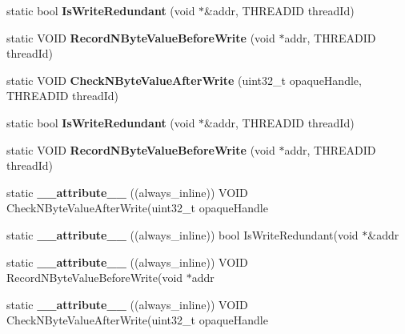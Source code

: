 \begin{DoxyCompactItemize}
\item 
\hypertarget{structRedSpyAnalysis_a0a5d87c8a4ffd7e99a66272071b48b2a}{static bool {\bfseries Is\-Write\-Redundant} (void $\ast$\&addr, T\-H\-R\-E\-A\-D\-I\-D thread\-Id)}\label{structRedSpyAnalysis_a0a5d87c8a4ffd7e99a66272071b48b2a}

\item 
\hypertarget{structRedSpyAnalysis_a267b5e1224f000fe96f66a25317811dd}{static V\-O\-I\-D {\bfseries Record\-N\-Byte\-Value\-Before\-Write} (void $\ast$addr, T\-H\-R\-E\-A\-D\-I\-D thread\-Id)}\label{structRedSpyAnalysis_a267b5e1224f000fe96f66a25317811dd}

\item 
\hypertarget{structRedSpyAnalysis_a25213888f435527a83af11e93c7d0bf5}{static V\-O\-I\-D {\bfseries Check\-N\-Byte\-Value\-After\-Write} (uint32\-\_\-t opaque\-Handle, T\-H\-R\-E\-A\-D\-I\-D thread\-Id)}\label{structRedSpyAnalysis_a25213888f435527a83af11e93c7d0bf5}

\item 
\hypertarget{structRedSpyAnalysis_a0a5d87c8a4ffd7e99a66272071b48b2a}{static bool {\bfseries Is\-Write\-Redundant} (void $\ast$\&addr, T\-H\-R\-E\-A\-D\-I\-D thread\-Id)}\label{structRedSpyAnalysis_a0a5d87c8a4ffd7e99a66272071b48b2a}

\item 
\hypertarget{structRedSpyAnalysis_a267b5e1224f000fe96f66a25317811dd}{static V\-O\-I\-D {\bfseries Record\-N\-Byte\-Value\-Before\-Write} (void $\ast$addr, T\-H\-R\-E\-A\-D\-I\-D thread\-Id)}\label{structRedSpyAnalysis_a267b5e1224f000fe96f66a25317811dd}

\item 
\hypertarget{structRedSpyAnalysis_ab62f13b23858cc46ae34b668b71afe80}{static {\bfseries \-\_\-\-\_\-attribute\-\_\-\-\_\-} ((always\-\_\-inline)) V\-O\-I\-D Check\-N\-Byte\-Value\-After\-Write(uint32\-\_\-t opaque\-Handle}\label{structRedSpyAnalysis_ab62f13b23858cc46ae34b668b71afe80}

\item 
\hypertarget{structRedSpyAnalysis_a7535fac0a0e053e60b39fa2f23b3701f}{static {\bfseries \-\_\-\-\_\-attribute\-\_\-\-\_\-} ((always\-\_\-inline)) bool Is\-Write\-Redundant(void $\ast$\&addr}\label{structRedSpyAnalysis_a7535fac0a0e053e60b39fa2f23b3701f}

\item 
\hypertarget{structRedSpyAnalysis_ad09b31fd6c23d44ab50798a11711fb1a}{static {\bfseries \-\_\-\-\_\-attribute\-\_\-\-\_\-} ((always\-\_\-inline)) V\-O\-I\-D Record\-N\-Byte\-Value\-Before\-Write(void $\ast$addr}\label{structRedSpyAnalysis_ad09b31fd6c23d44ab50798a11711fb1a}

\item 
\hypertarget{structRedSpyAnalysis_ab62f13b23858cc46ae34b668b71afe80}{static {\bfseries \-\_\-\-\_\-attribute\-\_\-\-\_\-} ((always\-\_\-inline)) V\-O\-I\-D Check\-N\-Byte\-Value\-After\-Write(uint32\-\_\-t opaque\-Handle}\label{structRedSpyAnalysis_ab62f13b23858cc46ae34b668b71afe80}

\end{DoxyCompactItemize}
